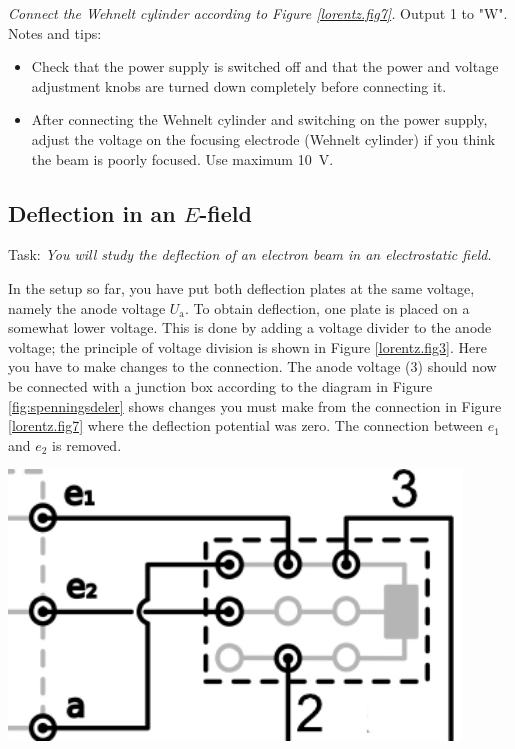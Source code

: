 \documentclass[../Elmag-labhefte-2020.tex]{subfiles}
\begin{document}
\emph{Connect the Wehnelt cylinder according to Figure \ref{lorentz.fig7}.}
Output 1 to "W".
Notes and tips:
\begin{itemize}
    \item Check that the power supply is switched off and that the power and voltage adjustment knobs are turned down completely before connecting it.
    \item After connecting the Wehnelt cylinder and switching on the power supply, adjust the voltage on the focusing electrode (Wehnelt cylinder) if you think the beam is poorly focused. Use maximum \SI{10}{\volt}.
\end{itemize}
\newpage

\subsection{Deflection in an \(E\)-field}

Task:
\emph{You will study the deflection of an electron beam in an electrostatic field.}

In the setup so far, you have put both deflection plates at the same voltage, namely the anode voltage $U_\mathrm{a}$. To obtain deflection, one plate is placed on a somewhat lower voltage.
This is done by adding a voltage divider to the anode voltage;
the principle of voltage division is shown in Figure \ref{lorentz.fig3}. Here you have to make changes to the connection. The anode voltage (3) should now be connected with a junction box according to the diagram in Figure \ref{fig:spenningsdeler} shows changes you must make from the connection in Figure \ref{lorentz.fig7} where the deflection potential was zero. The connection between  $e_1$ and $e_2$ is removed.
\begin{marginfigure}%
  \centering
    \includegraphics[width=0.9\textwidth]{fig/spenningsdeler-new.pdf}
    \caption{%
        Circuit diagram for connecting the voltage divider.
    }
    \label{fig:spenningsdeler}
\end{marginfigure}
\end{document}
